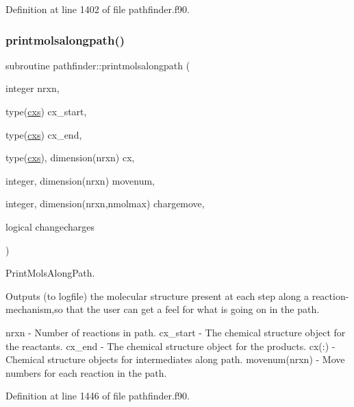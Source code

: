 Definition at line 1402 of file pathfinder.\+f90.

\mbox{\label{namespacepathfinder_ae5fe6225d1a966a604e1dc85be94b6e5}} 
\subsubsection{\texorpdfstring{printmolsalongpath()}{printmolsalongpath()}\hspace{0.1cm}{\footnotesize\ttfamily [1/2]}}
{\footnotesize\ttfamily subroutine pathfinder\+::printmolsalongpath (\begin{DoxyParamCaption}\item[{integer}]{nrxn,  }\item[{type(\mbox{\hyperlink{structchemstr_1_1cxs}{cxs}})}]{cx\+\_\+start,  }\item[{type(\mbox{\hyperlink{structchemstr_1_1cxs}{cxs}})}]{cx\+\_\+end,  }\item[{type(\mbox{\hyperlink{structchemstr_1_1cxs}{cxs}}), dimension(nrxn)}]{cx,  }\item[{integer, dimension(nrxn)}]{movenum,  }\item[{integer, dimension(nrxn,nmolmax)}]{chargemove,  }\item[{logical}]{changecharges }\end{DoxyParamCaption})}



Print\+Mols\+Along\+Path. 

Outputs (to logfile) the molecular structure present at each step along a reaction-\/mechanism,so that the user can get a feel for what is going on in the path.

nrxn -\/ Number of reactions in path. cx\+\_\+start -\/ The chemical structure object for the reactants. cx\+\_\+end -\/ The chemical structure object for the products. cx(\+:) -\/ Chemical structure objects for intermediates along path. movenum(nrxn) -\/ Move numbers for each reaction in the path. 

Definition at line 1446 of file pathfinder.\+f90.

\mbox{\label{namespacepathfinder_a6bb04da4443080b8f2061719fee556f3}} 
